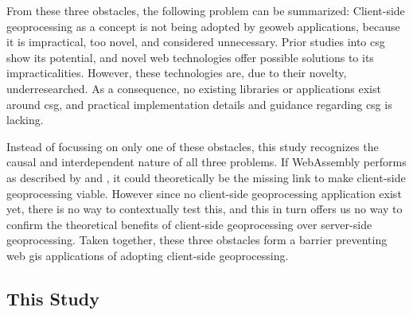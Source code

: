 
From these three obstacles, the following problem can be summarized: 
Client-side geoprocessing as a concept is not being adopted by geoweb applications, because it is impractical, too novel, and considered unnecessary. 
Prior studies into \ac{csg} show its potential, and novel web technologies offer possible solutions to its impracticalities. However, these technologies are, due to their novelty, underresearched. As a consequence, no existing libraries or applications exist around \ac{csg}, and practical implementation details and guidance regarding \ac{csg} is lacking.

Instead of focussing on only one of these obstacles, this study recognizes the causal and interdependent nature of all three problems. If WebAssembly performs as described by \cite{haas_bringing_2017} and \cite{jangda_not_2019}, it could theoretically be the missing link to make client-side geoprocessing viable. However since no client-side geoprocessing application exist yet, there is no way to contextually test this, and this in turn offers us no way to confirm the theoretical benefits of client-side geoprocessing over server-side geoprocessing. Taken together, these three obstacles form a barrier preventing web \ac{gis} applications of adopting client-side geoprocessing. 

\subsection{This Study}

